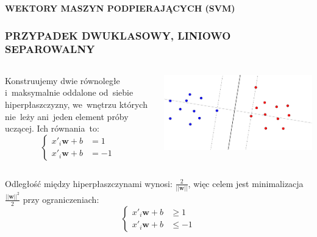 \documentclass[11pt,usenames,dvipsnames,svgnames,x11names]{beamer}
\theoremstyle{plain}
\theoremstyle{definition}
\theoremstyle{remark}
\begin{document}
\begin{frame}
\Huge
\centering
\textbf{WEKTORY MASZYN PODPIERAJĄCYCH (SVM)}
\end{frame}

\begin{frame}
\frametitle{\small PRZYPADEK DWUKLASOWY, LINIOWO SEPAROWALNY}
\begin{columns}
\begin{column}[t]{0.5\textwidth}
Konstruujemy dwie równoległe i~maksymalnie oddalone od~siebie hiperpłaszczyzny, we~wnętrzu których nie~leży ani~jeden element próby uczącej. Ich równania~to:
$$
\begin{cases}
x'_i\textbf{w}+b &= 1\\
x'_i\textbf{w}+b &= -1
\end{cases}
$$
\end{column}
\begin{column}[t]{0.5\textwidth}
\begin{center}
\includegraphics[width=\textwidth]{svm1.png}
\end{center}
\end{column}
\end{columns}

\vspace{5mm}
Odległość między hiperpłaszczynami wynosi: $\frac{2}{||\textbf{w}||}$, więc celem jest minimalizacja $\frac{||\textbf{w}||^2}{2}$ przy ograniczeniach:
$$
\begin{cases}
x'_i\textbf{w}+b &\geq 1\\
x'_i\textbf{w}+b &\leq -1
\end{cases}
$$
\end{frame}
\end{document}

